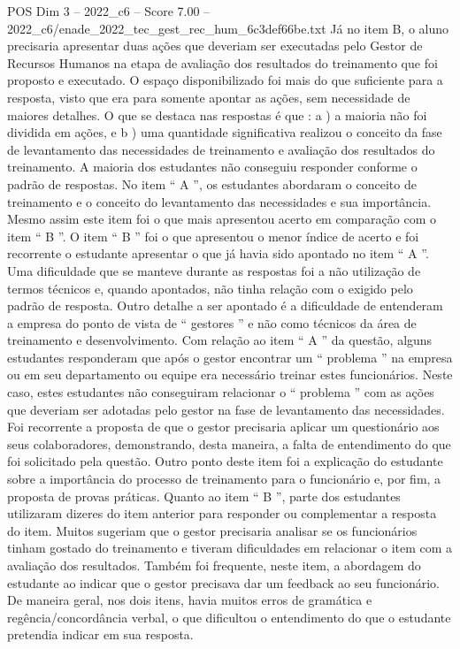 \begin{textsample}{POS Dim 3 – 2022\_c6 – Score 7.00 – 2022\_c6/enade\_2022\_tec\_gest\_rec\_hum\_6c3def66be.txt}
Já no item B, o aluno precisaria apresentar duas ações que deveriam ser executadas pelo Gestor de Recursos Humanos na etapa de avaliação dos resultados do treinamento que foi proposto e executado.
O espaço disponibilizado foi mais do que suficiente para a resposta, visto que era para somente apontar as ações, sem necessidade de maiores detalhes.
O que se destaca nas respostas é que : a ) a maioria não foi dividida em ações, e b ) uma quantidade significativa realizou o conceito da fase de levantamento das necessidades de treinamento e avaliação dos resultados do treinamento.
A maioria dos estudantes não conseguiu responder conforme o padrão de respostas.
No item “ A ”, os estudantes abordaram o conceito de treinamento e o conceito do levantamento das necessidades e sua importância.
Mesmo assim este item foi o que mais apresentou acerto em comparação com o item “ B ”.
O item “ B ” foi o que apresentou o menor índice de acerto e foi recorrente o estudante apresentar o que já havia sido apontado no item “ A ”.
Uma dificuldade que se manteve durante as respostas foi a não utilização de termos técnicos e, quando apontados, não tinha relação com o exigido pelo padrão de resposta.
Outro detalhe a ser apontado é a dificuldade de entenderam a empresa do ponto de vista de “ gestores ” e não como técnicos da área de treinamento e desenvolvimento.
Com relação ao item “ A ” da questão, alguns estudantes responderam que após o gestor encontrar um “ problema ” na empresa ou em seu departamento ou equipe era necessário treinar estes funcionários.
Neste caso, estes estudantes não conseguiram relacionar o “ problema ” com as ações que deveriam ser adotadas pelo gestor na fase de levantamento das necessidades.
Foi recorrente a proposta de que o gestor precisaria aplicar um questionário aos seus colaboradores, demonstrando, desta maneira, a falta de entendimento do que foi solicitado pela questão.
Outro ponto deste item foi a explicação do estudante sobre a importância do processo de treinamento para o funcionário e, por fim, a proposta de provas práticas.
Quanto ao item “ B ”, parte dos estudantes utilizaram dizeres do item anterior para responder ou complementar a resposta do item.
Muitos sugeriam que o gestor precisaria analisar se os funcionários tinham gostado do treinamento e tiveram dificuldades em relacionar o item com a avaliação dos resultados.
Também foi frequente, neste item, a abordagem do estudante ao indicar que o gestor precisava dar um feedback ao seu funcionário.
De maneira geral, nos dois itens, havia muitos erros de gramática e regência/concordância verbal, o que dificultou o entendimento do que o estudante pretendia indicar em sua resposta.

\end{textsample}
